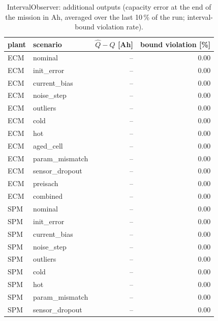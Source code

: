 \begin{table}[H]\centering\small\caption{IntervalObserver: additional outputs (capacity error at the end of the mission in Ah, averaged over the last 10\,\% of the run; interval-bound violation rate).}\label{tab:cellx_IntervalObserver}
\begin{tabular}{llrr}\toprule plant & scenario & $\hat Q - Q$ [Ah] & bound violation [\%] \\ \midrule
ECM & nominal & -- & 0.00 \\
ECM & init\_error & -- & 0.00 \\
ECM & current\_bias & -- & 0.00 \\
ECM & noise\_step & -- & 0.00 \\
ECM & outliers & -- & 0.00 \\
ECM & cold & -- & 0.00 \\
ECM & hot & -- & 0.00 \\
ECM & aged\_cell & -- & 0.00 \\
ECM & param\_mismatch & -- & 0.00 \\
ECM & sensor\_dropout & -- & 0.00 \\
ECM & preisach & -- & 0.00 \\
ECM & combined & -- & 0.00 \\
SPM & nominal & -- & 0.00 \\
SPM & init\_error & -- & 0.00 \\
SPM & current\_bias & -- & 0.00 \\
SPM & noise\_step & -- & 0.00 \\
SPM & outliers & -- & 0.00 \\
SPM & cold & -- & 0.00 \\
SPM & hot & -- & 0.00 \\
SPM & param\_mismatch & -- & 0.00 \\
SPM & sensor\_dropout & -- & 0.00 \\
\bottomrule\end{tabular}\end{table}
